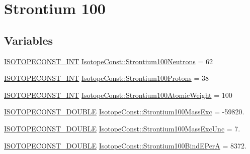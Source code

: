 \hypertarget{group___isotope_const-_strontium-_sr100}{}\section{Strontium 100}
\label{group___isotope_const-_strontium-_sr100}
\subsection*{Variables}
\begin{DoxyCompactItemize}
\item 
\mbox{\hyperlink{group___isotope_const-_macros_ga5f18360b3e99483a35c32d789e62621c}{I\+S\+O\+T\+O\+P\+E\+C\+O\+N\+S\+T\+\_\+\+I\+NT}} \mbox{\hyperlink{group___isotope_const-_strontium-_sr100_ga96a7eb0fe446b337bb1b7516d3316112}{Isotope\+Const\+::\+Strontium100\+Neutrons}} = 62
\item 
\mbox{\hyperlink{group___isotope_const-_macros_ga5f18360b3e99483a35c32d789e62621c}{I\+S\+O\+T\+O\+P\+E\+C\+O\+N\+S\+T\+\_\+\+I\+NT}} \mbox{\hyperlink{group___isotope_const-_strontium-_sr100_ga3984fc5c09d4cc7dc9e5000d4da87e73}{Isotope\+Const\+::\+Strontium100\+Protons}} = 38
\item 
\mbox{\hyperlink{group___isotope_const-_macros_ga5f18360b3e99483a35c32d789e62621c}{I\+S\+O\+T\+O\+P\+E\+C\+O\+N\+S\+T\+\_\+\+I\+NT}} \mbox{\hyperlink{group___isotope_const-_strontium-_sr100_ga87d35f8a023a9bd6d578680cbec67e41}{Isotope\+Const\+::\+Strontium100\+Atomic\+Weight}} = 100
\item 
\mbox{\hyperlink{group___isotope_const-_macros_ga8f45a7272ce02c0b4c65c44636ed719a}{I\+S\+O\+T\+O\+P\+E\+C\+O\+N\+S\+T\+\_\+\+D\+O\+U\+B\+LE}} \mbox{\hyperlink{group___isotope_const-_strontium-_sr100_ga899d2bbe9ff8cce0d3711db85173ff89}{Isotope\+Const\+::\+Strontium100\+Mass\+Exc}} = -\/59820.
\item 
\mbox{\hyperlink{group___isotope_const-_macros_ga8f45a7272ce02c0b4c65c44636ed719a}{I\+S\+O\+T\+O\+P\+E\+C\+O\+N\+S\+T\+\_\+\+D\+O\+U\+B\+LE}} \mbox{\hyperlink{group___isotope_const-_strontium-_sr100_gac91126e0c83923debcbb72ab7cfa328d}{Isotope\+Const\+::\+Strontium100\+Mass\+Exc\+Unc}} = 7.
\item 
\mbox{\hyperlink{group___isotope_const-_macros_ga8f45a7272ce02c0b4c65c44636ed719a}{I\+S\+O\+T\+O\+P\+E\+C\+O\+N\+S\+T\+\_\+\+D\+O\+U\+B\+LE}} \mbox{\hyperlink{group___isotope_const-_strontium-_sr100_ga9301c218a2dc9fdc303d7664ac49702c}{Isotope\+Const\+::\+Strontium100\+Bind\+E\+PerA}} = 8372.
\item 

\end{DoxyCompactItemize}
